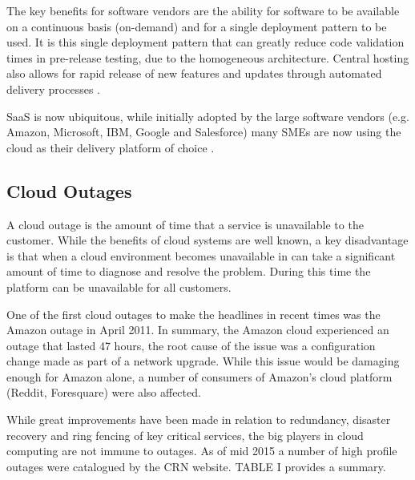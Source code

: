 \documentclass[conference]{IEEEtran}
\begin{document}
The key benefits for software vendors are the ability for software to be available on a continuous basis (on-demand) and for a single deployment pattern to be used. It is this single deployment pattern that can greatly reduce code validation times in pre-release testing, due to the homogeneous architecture. Central hosting also allows for rapid release of new features and updates through automated delivery processes \cite{datacentre2015}. \par

SaaS is now ubiquitous, while initially adopted by the large software vendors (e.g. Amazon, Microsoft, IBM, Google and Salesforce) many SMEs are now using the cloud as their delivery platform of choice \cite{CRN2015providers}. \par

\subsection{Cloud Outages}
A cloud outage is the amount of time that a service is unavailable to the customer. While the benefits of cloud systems are well known, a key disadvantage is that when a cloud environment becomes unavailable in can take a significant amount of time to diagnose and resolve the problem. During this time the platform can be unavailable for all customers. \par

One of the first cloud outages to make the headlines in recent times was the Amazon outage in April 2011. In summary, the Amazon cloud experienced an outage that lasted 47 hours, the root cause of the issue was a configuration change made as part of a network upgrade. While this issue would be damaging enough for Amazon alone, a number of consumers of Amazon's cloud platform (Reddit, Foresquare) were also affected. \cite{InfoWorld2015outage} \par

While great improvements have been made in relation to redundancy, disaster recovery and ring fencing of key critical services, the big players in cloud computing are not immune to outages. As of mid 2015 a number of high profile outages were catalogued by the CRN website. \cite{CRN2015outage} TABLE I provides a summary. \par
\end{document}
